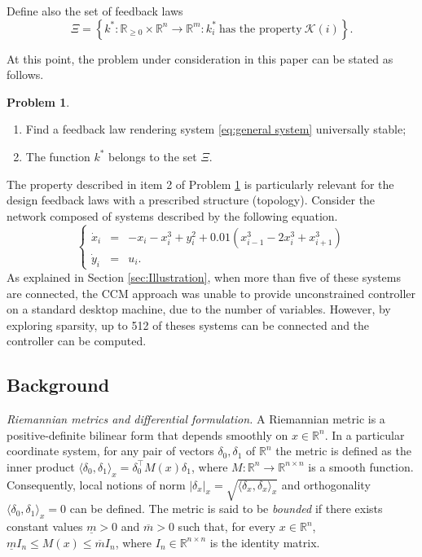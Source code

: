 \documentclass[10pt,twocolumn,twoside]{IEEEtran}
\theoremstyle{plain}
\theoremstyle{definition}
\newtheorem{problem}[theorem]{Problem}
\theoremstyle{remark}
\begin{document}
Define also the set of feedback laws
\begin{equation*}
	\Xi=\left\{k^\ast:\mathbb{R}_{\geq0}\times\mathbb{R}^n\to\mathbb{R}^m:k_i^\ast\ \text{has the property}\ \mathscr{K}(i)\right\}.
\end{equation*}

At this point, the problem under consideration in this paper can be stated as follows.

\begin{problem}\label{problem formulation}\hfill
	\begin{enumerate}
		\item Find a feedback law rendering system \eqref{eq:general system} universally stable;
		
		\item The function $k^\ast$ belongs to the set $\Xi$.
		\end{enumerate}
\end{problem}



The property described in item 2 of Problem \ref{problem formulation} is particularly relevant for the design feedback laws with a prescribed structure (topology). Consider the network composed of systems described by the following equation.
\begin{equation}\label{eq:example}
	\left\{\begin{array}{rcl}
		\dot{x}_i&=&-x_i-x_i^3+y_i^2 + 0.01\left(x_{i-1}^3 - 2x_i^3 +x_{i+1}^3\right)\\
		\dot{y}_i&=&u_i.
	\end{array}\right.
\end{equation}
As explained in Section \ref{sec:Illustration}, when more than five of these systems are connected, the CCM approach was unable to provide unconstrained controller on a standard desktop machine, due to the number of variables. However, by exploring sparsity, up to 512 of theses systems can be connected and the controller can be computed. 

\subsection{Background}\label{sec:background}

{\itshape Riemannian metrics and differential formulation.} A Riemannian metric is a positive-definite bilinear form that depends smoothly on $x\in\mathbb{R}^n$. In a particular coordinate system, for any pair of vectors $\delta_0,\delta_1$ of $\mathbb{R}^n$ the metric is defined as the inner product $\langle\delta_0,\delta_{ 1}\rangle_x=\delta_0^\top M(x)\delta_1$, where $M:\mathbb{R}^n\to\mathbb{R}^{n\times n}$ is a smooth function. Consequently, local notions of norm $|\delta_x|_x=\sqrt{\langle\delta_x,\delta_x\rangle_x}$ and orthogonality $\langle\delta_0,\delta_1\rangle_x=0$ can be defined. The metric is said to be \emph{bounded} if there exists constant values $\underline{m}>0$ and $\overline{m}>0$ such that, for every $x\in\mathbb{R}^n$, $\underline{m}I_n\leq M(x)\leq \overline{m}I_n$, where $I_n\in\mathbb{R}^{n\times n}$ is the identity matrix.
\end{document}
